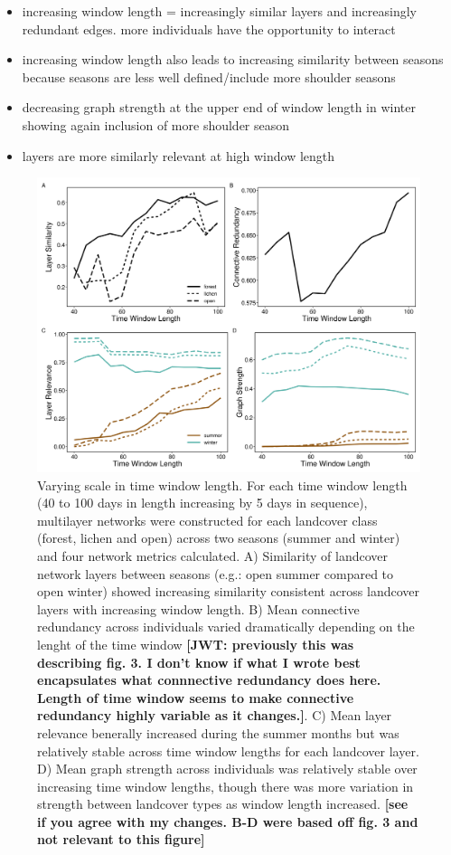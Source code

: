 \documentclass[]{article}
\providecommand{\tightlist}{%
  \setlength{\itemsep}{0pt}\setlength{\parskip}{0pt}}
\begin{document}
\begin{itemize}
\tightlist
\item
  increasing window length = increasingly similar layers and increasingly redundant edges. more individuals have the opportunity to interact
\item
  increasing window length also leads to increasing similarity between seasons because seasons are less well defined/include more shoulder seasons
\item
  decreasing graph strength at the upper end of window length in winter showing again inclusion of more shoulder season
\item
  layers are more similarly relevant at high window length
\end{itemize}

\begin{figure}
\includegraphics[width=\linewidth]{../graphics/figure-winlength} \caption{Varying scale in time window length. For each time window length (40 to 100 days in length increasing by 5 days in sequence), multilayer networks were constructed for each landcover class (forest, lichen and open) across two seasons (summer and winter) and four network metrics calculated. A) Similarity of landcover network layers between seasons (e.g.: open summer compared to open winter) showed increasing similarity consistent across landcover layers with increasing window length. B) Mean connective redundancy across individuals varied dramatically depending on the lenght of the time window \textbf{{[}JWT: previously this was describing fig. 3. I don't know if what I wrote best encapsulates what connnective redundancy does here. Length of time window seems to make connective redundancy highly variable as it changes.{]}}. C) Mean layer relevance benerally increased during the summer months but was relatively stable across time window lengths for each landcover layer. D) Mean graph strength across individuals was relatively stable over increasing time window lengths, though there was more variation in strength between landcover types as window length increased. \textbf{{[}see if you agree with my changes. B-D were based off fig. 3 and not relevant to this figure{]}}}\label{fig:unnamed-chunk-5}
\end{figure}
\end{document}
